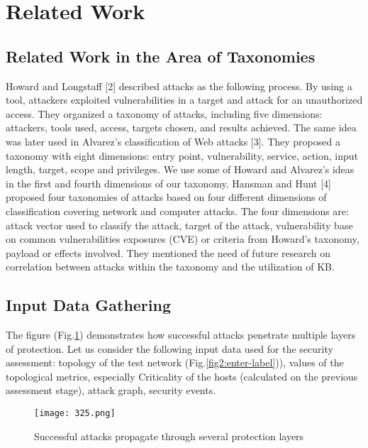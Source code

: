 \documentclass[preprint]{oscmjournal}
\begin{document}
\tableofcontents
\newpage

\section{Related Work}
\subsection{Related Work in the Area of Taxonomies}
Howard and Longstaff [2] described attacks as the following process. By using a tool, attackers exploited vulnerabilities in a target and attack for an unauthorized access. They organized a taxonomy of attacks, including five dimensions: attackers, tools used, access, targets chosen, and results achieved. The same idea was later used in Alvarez’s classification of Web attacks [3]. They proposed a taxonomy with eight dimensions: entry point, vulnerability, service, action, input length, target, scope and privileges. We use some of Howard and Alvarez’s ideas in the first and fourth dimensions of our taxonomy. Hansman and Hunt [4] proposed four taxonomies of attacks based on four different dimensions of classification covering network and computer attacks. The four dimensions are: attack vector used to classify the attack, target of the attack, vulnerability base on common vulnerabilities exposures (CVE) or criteria from Howard’s taxonomy, payload or effects involved. They mentioned the need of future research on correlation between attacks within the taxonomy and the utilization of KB.  

\subsection{Input Data Gathering}
The figure (Fig.\ref{fig1:enter-label}) demonstrates how successful attacks penetrate multiple layers of protection. Let us consider the following input data used for the security assessment: topology of the test network (Fig.\ref{fig2:enter-label})), values of the topological metrics, especially Criticality of the hosts (calculated on the previous assessment stage), attack graph, security events.\\

\begin{figure}[h]
    \centering
    \texttt{[image: 325.png]}
    \caption{Successful attacks propagate through several protection layers}
    \label{fig1:enter-label}
\end{figure}
\
\end{document}
